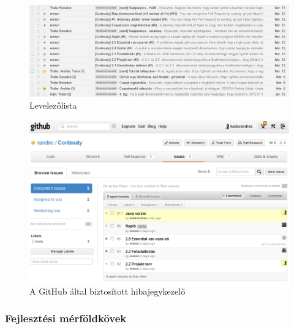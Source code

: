 	\begin{figure}[ht]
		\begin{center}
			\includegraphics[scale=0.5]{resources/levlista.png}
			\caption{Levelezőlista}
		\end{center}
	\end{figure}
	
	\begin{figure}[ht]
		\begin{center}
			\includegraphics[scale=0.5]{resources/issues.png}
			\caption{A GitHub által biztosított hibajegykezelő}
		\end{center}
	\end{figure}

    \subsubsection{Fejlesztési mérföldkövek}


